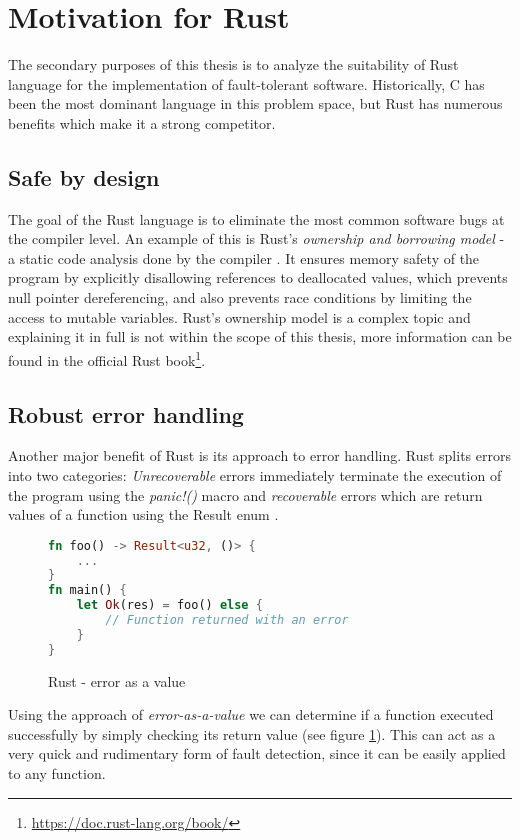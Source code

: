 \section{Motivation for Rust}
The secondary purposes of this thesis is to analyze the suitability of Rust language for the implementation of fault-tolerant software. Historically, C has been the most dominant language in this problem space, but Rust has numerous benefits which make it a strong competitor.

\subsection{Safe by design}
The goal of the Rust language is to eliminate the most common software bugs at the compiler level. An example of this is Rust's \textit{ownership and borrowing model} - a static code analysis done by the compiler \cite{rust_book:ownership}. It ensures memory safety of the program by explicitly disallowing references to deallocated values, which prevents null pointer dereferencing, and also prevents race conditions by limiting the access to mutable variables. Rust's ownership model is a complex topic and explaining it in full is not within the scope of this thesis, more information can be found in the official Rust book\footnote{\url{https://doc.rust-lang.org/book/}}.

\subsection{Robust error handling}
Another major benefit of Rust is its approach to error handling. Rust splits errors into two categories: \textit{Unrecoverable} errors immediately terminate the execution of the program using the \textit{panic!()} macro and \textit{recoverable} errors which are return values of a function using the Result enum \cite{rust_book:error_handling}.

\begin{figure}[!h]
\begin{lstlisting}[language=Rust]
fn foo() -> Result<u32, ()> {
    ...
}
fn main() {
    let Ok(res) = foo() else {
        // Function returned with an error
    }
}
\end{lstlisting}
\caption{Rust - error as a value}
\label{fig:rust_error}
\end{figure}

Using the approach of \textit{error-as-a-value} we can determine if a function executed successfully by simply checking its return value (see figure \ref{fig:rust_error}). This can act as a very quick and rudimentary form of fault detection, since it can be easily applied to any function.

